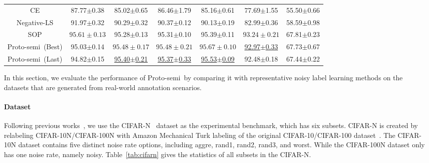 \documentclass[letterpaper]{article} %
\newcommand{\method}{Proto-semi}
\begin{document}
\begin{table}[h]
\begin{tabular}{c|ccccc|c}
    CE & 87.77$\pm$0.38 & 85.02$\pm$0.65 & 86.46$\pm$1.79 & 85.16$\pm$0.61 & 77.69$\pm$1.55 & 55.50$\pm$0.66\\
    Negative-LS & 91.97$\pm$0.32 & 90.29$\pm$0.32 & 90.37$\pm$0.12 & 90.13$\pm$0.19 & 82.99$\pm$0.36 & 58.59$\pm$0.98\\
    SOP & $\mathbf{95.61\pm0.13}$ & 95.28$\pm$0.13 & 95.31$\pm$0.10 &  95.39$\pm$0.11 & $\mathbf{93.24\pm0.21}$ & 67.81$\pm$0.23\\
    \midrule
    \method\ (Best) & 95.03$\pm$0.14 & $\mathbf{95.48\pm0.17}$ & $\mathbf{95.48\pm0.21}$ & $\mathbf{95.67\pm0.10}$ &  \underline{92.97$\pm$0.33} & 67.73$\pm$0.67\\
    \method\ (Last)& 94.82$\pm$0.15 &  \underline{95.40$\pm$0.21}  &  \underline{95.37$\pm$0.33} &  \underline{95.53$\pm$0.09} & 92.48$\pm$0.18 & 67.44$\pm$0.22 \\
  \bottomrule
  \end{tabular}
\end{table}


In this section, we evaluate the performance of \method\ by comparing it with representative noisy label learning methods on the datasets that are generated from real-world annotation scenarios. 

\paragraph{Dataset} 

\begin{table}[h]
  \caption{The statistics of CIFAR-N dataset}
  \label{tab:cifarn}
  \centering
\end{table}
Following previous works~\cite{DBLP:conf/icml/LiuZQY22}, we use the CIFAR-N~\cite{DBLP:conf/iclr/WeiZ0L0022} dataset as the experimental benchmark, which has six subsets. CIFAR-N is created by relabeling CIFAR-10N/CIFAR-100N with Amazon Mechanical Turk labeling of the original CIFAR-10/CIFAR-100 dataset~\cite{krizhevsky2009learning}. The CIFAR-10N dataset contains five distinct noise rate options, including aggre, rand1, rand2, rand3, and worst. While the CIFAR-100N dataset only has one noise rate, namely noisy. Table~\ref{tab:cifarn} gives the statistics of all subsets in the CIFAR-N.
\end{document}
